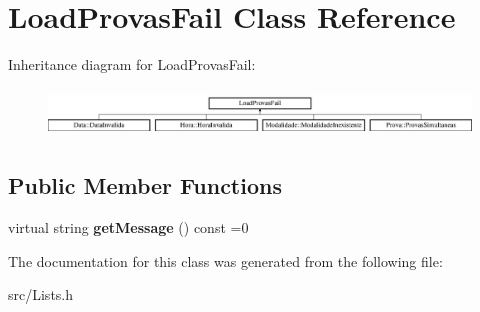\hypertarget{class_load_provas_fail}{}\section{Load\+Provas\+Fail Class Reference}
\label{class_load_provas_fail}
Inheritance diagram for Load\+Provas\+Fail\+:\begin{figure}[H]
\begin{center}
\leavevmode
\includegraphics[height=1.290323cm]{class_load_provas_fail}
\end{center}
\end{figure}
\subsection*{Public Member Functions}
\begin{DoxyCompactItemize}
\item 
\hypertarget{class_load_provas_fail_a46bb569d3369817320b2037dc6d8a14f}{}virtual string {\bfseries get\+Message} () const  =0\label{class_load_provas_fail_a46bb569d3369817320b2037dc6d8a14f}

\end{DoxyCompactItemize}


The documentation for this class was generated from the following file\+:\begin{DoxyCompactItemize}
\item 
src/Lists.\+h\end{DoxyCompactItemize}

